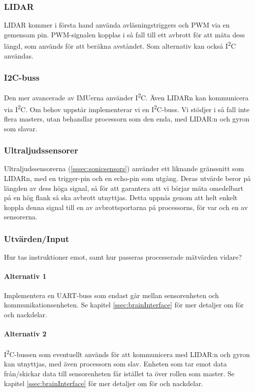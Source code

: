 \documentclass[a4paper,11pt]{article}
\begin{document}
\subsubsection{LIDAR}
LIDAR kommer i första hand använda avläsningstriggers och PWM via en gemensam pin. PWM-signalen kopplas i så fall till ett avbrott för att mäta dess längd, som används för att beräkna avståndet. Som alternativ kan också I\textsuperscript{2}C användas.

\subsubsection{I2C-buss}
Den mer avancerade av IMUerna använder I\textsuperscript{2}C. Även LIDARn kan kommunicera via I\textsuperscript{2}C. Om behov uppstår implementerar vi en I\textsuperscript{2}C-buss. Vi stödjer i så fall inte flera masters, utan behandlar processorn som den enda, med LIDAR:n och gyron som slavar.

\subsubsection{Ultraljudssensorer}
Ultraljudssensorerna (\ref{sssec:sonicsensors}) använder ett liknande gränssnitt som LIDARn, med en trigger-pin och en echo-pin som utgång. Deras utvärde beror på längden av dess höga signal, så för att garantera att vi börjar mäta omedelbart på en hög flank så ska avbrott utnyttjas. Detta uppnås genom att helt enkelt koppla denna signal till en av avbrottsportarna på processorns, för var och en av sensorerna.

\subsubsection{Utvärden/Input}
Hur tas instruktioner emot, samt hur passeras processerade mätvärden vidare?

\paragraph{Alternativ 1}
Implementera en UART-buss som endast går mellan sensorenheten och kommunikationsenheten. Se kapitel \ref{ssec:brainInterface} för mer detaljer om för och nackdelar.

\paragraph{Alternativ 2}
I\textsuperscript{2}C-bussen som eventuellt används för att kommunicera med LIDAR:n och gyron kan utnyttjas, med även processorn som slav. Enheten som tar emot data från/skickar data till sensorenheten får istället ta över rollen som master. Se kapitel \ref{ssec:brainInterface} för mer detaljer om för och nackdelar.
\end{document}

